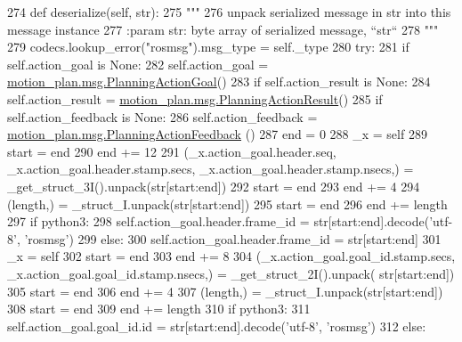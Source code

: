 \begin{DoxyCode}
274   \textcolor{keyword}{def }deserialize(self, str):
275     \textcolor{stringliteral}{"""}
276 \textcolor{stringliteral}{    unpack serialized message in str into this message instance}
277 \textcolor{stringliteral}{    :param str: byte array of serialized message, ``str``}
278 \textcolor{stringliteral}{    """}
279     codecs.lookup\_error(\textcolor{stringliteral}{"rosmsg"}).msg\_type = self.\_type
280     \textcolor{keywordflow}{try}:
281       \textcolor{keywordflow}{if} self.action\_goal \textcolor{keywordflow}{is} \textcolor{keywordtype}{None}:
282         self.action\_goal = \hyperlink{classmotion__plan_1_1msg_1_1__PlanningActionGoal_1_1PlanningActionGoal}{motion\_plan.msg.PlanningActionGoal}()
283       \textcolor{keywordflow}{if} self.action\_result \textcolor{keywordflow}{is} \textcolor{keywordtype}{None}:
284         self.action\_result = \hyperlink{classmotion__plan_1_1msg_1_1__PlanningActionResult_1_1PlanningActionResult}{motion\_plan.msg.PlanningActionResult}()
285       \textcolor{keywordflow}{if} self.action\_feedback \textcolor{keywordflow}{is} \textcolor{keywordtype}{None}:
286         self.action\_feedback = \hyperlink{classmotion__plan_1_1msg_1_1__PlanningActionFeedback_1_1PlanningActionFeedback}{motion\_plan.msg.PlanningActionFeedback}
      ()
287       end = 0
288       \_x = self
289       start = end
290       end += 12
291       (\_x.action\_goal.header.seq, \_x.action\_goal.header.stamp.secs, \_x.action\_goal.header.stamp.nsecs,) = 
      \_get\_struct\_3I().unpack(str[start:end])
292       start = end
293       end += 4
294       (length,) = \_struct\_I.unpack(str[start:end])
295       start = end
296       end += length
297       \textcolor{keywordflow}{if} python3:
298         self.action\_goal.header.frame\_id = str[start:end].decode(\textcolor{stringliteral}{'utf-8'}, \textcolor{stringliteral}{'rosmsg'})
299       \textcolor{keywordflow}{else}:
300         self.action\_goal.header.frame\_id = str[start:end]
301       \_x = self
302       start = end
303       end += 8
304       (\_x.action\_goal.goal\_id.stamp.secs, \_x.action\_goal.goal\_id.stamp.nsecs,) = \_get\_struct\_2I().unpack(
      str[start:end])
305       start = end
306       end += 4
307       (length,) = \_struct\_I.unpack(str[start:end])
308       start = end
309       end += length
310       \textcolor{keywordflow}{if} python3:
311         self.action\_goal.goal\_id.id = str[start:end].decode(\textcolor{stringliteral}{'utf-8'}, \textcolor{stringliteral}{'rosmsg'})
312       \textcolor{keywordflow}{else}:

\end{DoxyCode}
